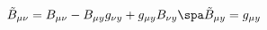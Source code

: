 \begin{equation}
\tilde{B}_{\mu \nu} = B_{\mu \nu}
- B_{\mu y} g_{\nu y} + g_{\mu y} B_{\nu y}
\spa
\tilde{B}_{\mu y} = g_{\mu y}
\end{equation}

